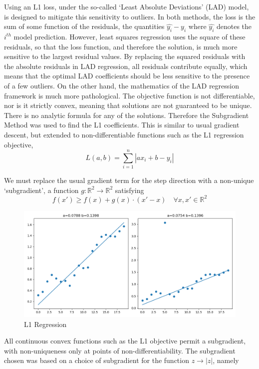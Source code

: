 \documentclass[12pt]{article}
\begin{document}
Using an L1 loss, under the so-called `Least Absolute Deviations' (LAD) model,
is designed to mitigate this sensitivity to outliers.
In both methods, the loss is the sum of some function of the residuals, the quantities $\hat{y_i} - y_i$ where $\hat{y_i}$ denotes the $i^{th}$ model prediction.
However, least squares regression uses the square of these residuals, so that the loss function, and therefore the solution, is much more sensitive to the largest residual values.
By replacing the squared residuals with the absolute residuals in LAD regression, all residuals contribute equally,
which means that the optimal LAD coefficients should be less sensitive to the presence of a few outliers.
On the other hand, the mathematics of the LAD regression framework is much more pathological.
The objective function is not differentiable, nor is it strictly convex, meaning that solutions are not guaranteed to be unique.
There is no analytic formula for any of the solutions.
Therefore the Subgradient Method was used to find the L1 coefficients.
This is similar to usual gradient descent, but extended to non-differentiable functions such as the L1 regression objective,
\[L(a,b) = \sum_{i=1}^{n}{|ax_i + b - y_i|}\]

We must replace the usual gradient term for the step direction with a non-unique `subgradient', a function $g:\mathbb{R}^2\rightarrow\mathbb{R}^2$ satisfying \cite{convex}
\[f(x')\geq f(x) + g(x)\cdot(x'-x) \quad \forall x, x' \in\mathbb{R}^2\]

\begin{figure}[htp]
    \includegraphics[scale=0.5, center]{figures/regression_l1.png}
    \caption{L1 Regression}
    \label{fig:regression_l1}
\end{figure}

All continuous convex functions such as the L1 objective permit a subgradient,
with non-uniqueness only at points of non-differentiability.
The subgradient chosen was based on a choice of subgradient for the function $z\rightarrow|z|$,
namely
\end{document}
